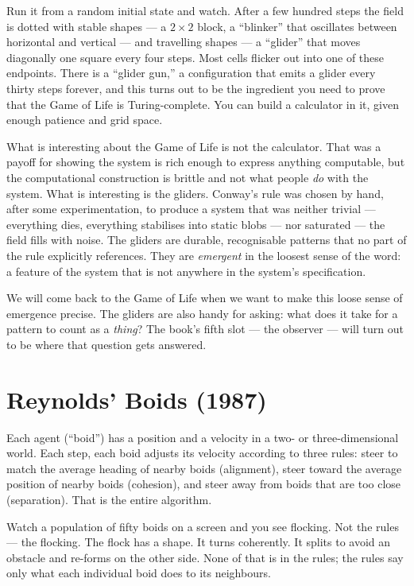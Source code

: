 Run it from a random initial state and watch. After a few hundred steps
the field is dotted with stable shapes --- a $2 \times 2$ block, a
``blinker'' that oscillates between horizontal and vertical --- and
travelling shapes --- a ``glider'' that moves diagonally one square
every four steps. Most cells flicker out into one of these endpoints.
There is a ``glider gun,'' a configuration that emits a glider every
thirty steps forever, and this turns out to be the ingredient you need
to prove that the Game of Life is Turing-complete. You can build a
calculator in it, given enough patience and grid space.

What is interesting about the Game of Life is not the calculator. That
was a payoff for showing the system is rich enough to express anything
computable, but the computational construction is brittle and not what
people \emph{do} with the system. What is interesting is the gliders.
Conway's rule was chosen by hand, after some experimentation, to
produce a system that was neither trivial --- everything dies,
everything stabilises into static blobs --- nor saturated --- the
field fills with noise. The gliders are durable, recognisable patterns
that no part of the rule explicitly references. They are
\emph{emergent} in the loosest sense of the word: a feature of the
system that is not anywhere in the system's specification.

We will come back to the Game of Life when we want to make this loose
sense of emergence precise. The gliders are also handy for asking:
what does it take for a pattern to count as a \emph{thing}? The book's
fifth slot --- the observer --- will turn out to be where that question
gets answered.

\section{Reynolds' Boids (1987)}

Each agent (``boid'') has a position and a velocity in a two- or
three-dimensional world. Each step, each boid adjusts its velocity
according to three rules: steer to match the average heading of nearby
boids (alignment), steer toward the average position of nearby boids
(cohesion), and steer away from boids that are too close (separation).
That is the entire algorithm.

Watch a population of fifty boids on a screen and you see flocking. Not
the rules --- the flocking. The flock has a shape. It turns coherently.
It splits to avoid an obstacle and re-forms on the other side. None of
that is in the rules; the rules say only what each individual boid does
to its neighbours.

